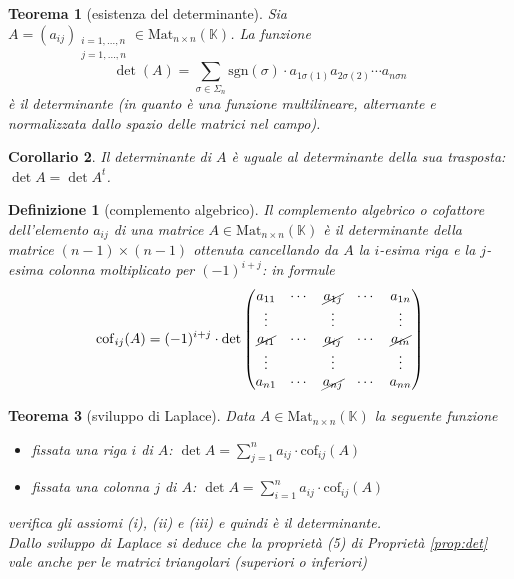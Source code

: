 \documentclass[9pt, a4paper]{article}
\newcommand{\K}{\mathbb{K}}
\newcommand{\sgn}{\mathrm{sgn}}
\newcommand{\cof}{\mathrm{cof}}
\theoremstyle{mythm}
\newtheorem{definition}{Definizione}[section]
\newtheorem{thm}{Teorema}[section]
\newtheorem{corollary}[thm]{Corollario}
\begin{document}
\begin{thm}[esistenza del determinante]
	Sia $ A = (a_{ij})_{\substack{i = 1, \ldots, n \\ j = 1, \ldots, n}} \in \mathrm{Mat}_{n \times n} (\K) $. La funzione \[\det(A) = \sum_{\sigma \in \Sigma_n} \sgn(\sigma) \cdot a_{1 \sigma(1)} a_{2 \sigma(2)} \cdots a_{n \sigma{n}}\] è il determinante (in quanto è una funzione multilineare, alternante e normalizzata dallo spazio delle matrici nel campo). 
\end{thm}

\begin{corollary}
	Il determinante di $ A $ è uguale al determinante della sua trasposta: $ \det A = \det A^{t} $. 
\end{corollary}

\begin{definition}[complemento algebrico]
	Il complemento algebrico o cofattore dell'elemento $ a_{ij} $ di una matrice $ A \in \mathrm{Mat}_{n \times n} (\K) $ è il determinante della matrice $ (n - 1) \times (n - 1) $ ottenuta cancellando da $ A $ la $ i $-esima riga e la $ j $-esima colonna moltiplicato per $ (-1)^{i + j} $: in formule
	\[\cof_{ij}(A) = (-1)^{i + j} \cdot \det 
	\begin{pmatrix}
		a_{11} & \cdots & \cancel{a_{1j}} & \cdots & a_{1n} \\
		\vdots &        & \vdots &        & \vdots \\
		\cancel{a_{i1}} & \cdots & \cancel{a_{ij}} & \cdots & \cancel{a_{in}} \\
		\vdots &  		& \vdots &  	  & \vdots \\
		a_{n1} & \cdots & \cancel{a_{nj}} & \cdots & a_{nn} \\
	\end{pmatrix}\]
\end{definition}

\begin{thm}[sviluppo di Laplace]
	Data $ A \in \mathrm{Mat}_{n \times n} (\K) $ la seguente funzione
	\begin{itemize}
		\item fissata una riga $ i $ di $ A $: $ \det A = \sum_{j = 1}^{n} a_{ij} \cdot \cof_{ij} (A) $
		\item fissata una colonna $ j $ di $ A $: $ \det A = \sum_{i = 1}^{n} a_{ij} \cdot \cof_{ij} (A) $
	\end{itemize}
	verifica gli assiomi (i), (ii) e (iii) e quindi è il determinante. \\
	Dallo sviluppo di Laplace si deduce che la proprietà (5) di Proprietà \ref{prop:det} vale anche per le matrici triangolari (superiori o inferiori)
\end{thm}
\end{document}
